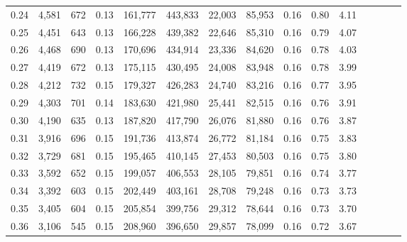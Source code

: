 \begin{tabular}{rrrcrrrrrrrrrrr}
0.24 &   4,581 &     672 &                                       0.13 &  161,777 &  443,833 &   22,003 &  85,953 &  0.16 &  0.80 &                         4.11 \\
0.25 &   4,451 &     643 &                                       0.13 &  166,228 &  439,382 &   22,646 &  85,310 &  0.16 &  0.79 &                         4.07 \\
0.26 &   4,468 &     690 &                                       0.13 &  170,696 &  434,914 &   23,336 &  84,620 &  0.16 &  0.78 &                         4.03 \\
0.27 &   4,419 &     672 &                                       0.13 &  175,115 &  430,495 &   24,008 &  83,948 &  0.16 &  0.78 &                         3.99 \\
0.28 &   4,212 &     732 &                                       0.15 &  179,327 &  426,283 &   24,740 &  83,216 &  0.16 &  0.77 &                         3.95 \\
0.29 &   4,303 &     701 &                                       0.14 &  183,630 &  421,980 &   25,441 &  82,515 &  0.16 &  0.76 &                         3.91 \\
0.30 &   4,190 &     635 &                                       0.13 &  187,820 &  417,790 &   26,076 &  81,880 &  0.16 &  0.76 &                         3.87 \\
0.31 &   3,916 &     696 &                                       0.15 &  191,736 &  413,874 &   26,772 &  81,184 &  0.16 &  0.75 &                         3.83 \\
0.32 &   3,729 &     681 &                                       0.15 &  195,465 &  410,145 &   27,453 &  80,503 &  0.16 &  0.75 &                         3.80 \\
0.33 &   3,592 &     652 &                                       0.15 &  199,057 &  406,553 &   28,105 &  79,851 &  0.16 &  0.74 &                         3.77 \\
0.34 &   3,392 &     603 &                                       0.15 &  202,449 &  403,161 &   28,708 &  79,248 &  0.16 &  0.73 &                         3.73 \\
0.35 &   3,405 &     604 &                                       0.15 &  205,854 &  399,756 &   29,312 &  78,644 &  0.16 &  0.73 &                         3.70 \\
0.36 &   3,106 &     545 &                                       0.15 &  208,960 &  396,650 &   29,857 &  78,099 &  0.16 &  0.72 &                         3.67 \\

\end{tabular}
